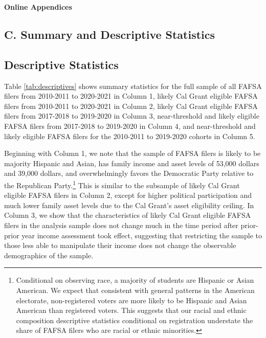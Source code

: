 \documentclass[12pt,letterpaper,oneside]{book}
\begin{document}
\clearpage









    \clearpage

    \appendix
    \textbf{\huge{Online Appendices}}

    \subsection*{C. Summary and Descriptive Statistics}\label{sec:appendixc}

    \subsection{Descriptive Statistics}\label{sec:descriptive}
    Table \ref{tab:descriptives} shows summary statistics for the full sample of all FAFSA filers from 2010-2011 to 2020-2021 in Column 1, likely Cal Grant eligible FAFSA filers from 2010-2011 to 2020-2021 in Column 2, likely Cal Grant eligible FAFSA filers from 2017-2018 to 2019-2020 in Column 3, near-threshold and likely eligible FAFSA filers from 2017-2018 to 2019-2020 in Column 4, and near-threshold and likely eligible FAFSA filers for the 2010-2011 to 2019-2020 cohorts in Column 5.

    Beginning with Column 1, we note that the sample of FAFSA filers is likely to be majority Hispanic and Asian, has family income and asset levels of 53,000 dollars and 39,000 dollars, and overwhelmingly favors the Democratic Party relative to the Republican Party.\footnote{Conditional on observing race, a majority of students are Hispanic or Asian American. We expect that consistent with general patterns in the American electorate, non-registered voters are more likely to be Hispanic and Asian American than registered voters. This suggests that our racial and ethnic composition descriptive statistics conditional on registration understate the share of FAFSA filers who are racial or ethnic minorities.} This is similar to the subsample of likely Cal Grant eligible FAFSA filers in Column 2, except for higher political participation and much lower family asset levels due to the Cal Grant's asset eligibility ceiling. In Column 3, we show that the characteristics of likely Cal Grant eligible FAFSA filers in the analysis sample does not change much in the time period after prior-prior year income assessment took effect, suggesting that restricting the sample to those less able to manipulate their income does not change the observable demographics of the sample.
\end{document}
